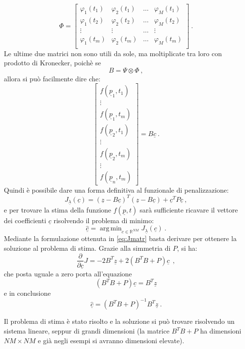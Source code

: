 \documentclass[a4paper,11pt,twoside,openright]{book}							%
\DeclareMathOperator*{\argmin}{arg\,min}
\begin{document}
$$
\Phi = 
\begin{bmatrix}
\varphi_{1}( t_1) & \varphi_{2}( t_1) & \hdots & \varphi_{M}( t_1)  \\
\varphi_{1}( t_2) & \varphi_{2}( t_2) & \hdots & \varphi_{M}( t_2)  \\
\vdots & \vdots & \hdots & \vdots \\
\varphi_{1}( t_m) & \varphi_{2}( t_m) & \hdots & \varphi_{M}( t_m)  \\
\end{bmatrix} \ .
$$
Le ultime due matrici non sono utili da sole, ma moltiplicate tra loro con prodotto di Kronecker, poichè se
$$ B = \Psi \otimes \Phi \ ,$$
allora si può facilmente dire che:
$$
\begin{bmatrix}
f(\underline p_1,t_1)  \\
\vdots\\
f(\underline p_1,t_m)  \\
f(\underline p_2,t_1)  \\
\vdots\\
f(\underline p_2,t_m)  \\
\vdots\\
f(\underline p_n,t_m)
\end{bmatrix}= B \underline c \ .
$$
Quindi è possibile dare una forma definitiva al funzionale di penalizzazione:
\begin{equation} 
\label{eq:Jmatr}
J_{\underline \lambda }(\underline c) = (\underline z - B \underline c)^T (\underline z - B \underline c) + \underline c^T P \underline c \ ,
\end{equation}
e per trovare la stima della funzione $f(\underline{p},t)$ sarà sufficiente ricavare il vettore dei coefficienti $\underline c$ risolvendo il problema di minimo:
$$
\hat{\underline{c}}=\argmin_{c \in \mathbb{R}^{NM}} J_{\underline \lambda }(\underline c) \ .
$$
Mediante la formulazione ottenuta in \ref{eq:Jmatr} basta derivare per ottenere la soluzione al problema di stima. Grazie alla simmetria di $P$, si ha:
$$
\frac{\partial}{\partial \underline c}J= -2 B^T \underline z + 2(B^T B + P) \underline c \ \ ,
$$
che posta uguale a zero porta all'equazione
$$
(B^T B + P) \underline c = B^T\underline z
$$ 
e in conclusione
\begin{equation}
\label{eq:sysnocovar}
\hat  {\underline c} = (B^T B + P)^{-1}B^T \underline z \ .
\end{equation} 

Il problema di stima è stato risolto e la soluzione si può trovare risolvendo un sistema lineare, seppur di grandi dimensioni (la matrice $B^T B + P$ ha dimensioni $NM \times NM$ e già negli esempi si avranno dimensioni elevate).
\end{document}

